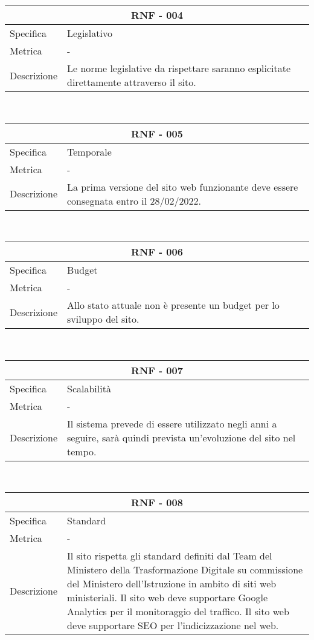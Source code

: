 \documentclass{article}
\begin{document}
\vspace{4mm} 
\begin{tabular}{ |p{3cm}|p{8cm}|  }
	\hline
	\multicolumn{2}{|c|}{\textbf{RNF - 004}} \\
	\hline
	Specifica&Legislativo\\
	\hline
	Metrica &  -\\
	\hline
	Descrizione&Le norme legislative da rispettare saranno esplicitate direttamente attraverso il sito.\\
	\hline
\end{tabular}\\
\vspace{4mm} 
\begin{tabular}{ |p{3cm}|p{8cm}|  }
	\hline
	\multicolumn{2}{|c|}{\textbf{RNF - 005}} \\
	\hline
	Specifica&Temporale \\
	\hline
	Metrica &  -\\
	\hline
	Descrizione&La prima versione del sito web funzionante deve essere consegnata entro il 28/02/2022.\\
	\hline
\end{tabular}\\
\vspace{4mm} 
\begin{tabular}{ |p{3cm}|p{8cm}|  }
	\hline
	\multicolumn{2}{|c|}{\textbf{RNF - 006}} \\
	\hline
	Specifica&Budget \\
	\hline
	Metrica &  -\\
	\hline
	Descrizione&Allo stato attuale non è presente un budget per lo sviluppo del sito.\\
	\hline
\end{tabular}\\
\vspace{4mm} 
\begin{tabular}{ |p{3cm}|p{8cm}|  }
	\hline
	\multicolumn{2}{|c|}{\textbf{RNF - 007}} \\
	\hline
	Specifica&Scalabilità \\
	\hline
	Metrica &  -\\
	\hline
	Descrizione&Il sistema prevede di essere utilizzato negli anni a seguire, sarà quindi prevista un'evoluzione del sito nel tempo.\\
	\hline
\end{tabular}\\
\vspace{4mm} 
\begin{tabular}{ |p{3cm}|p{8cm}|  }
	\hline
	\multicolumn{2}{|c|}{\textbf{RNF - 008}} \\
	\hline
	Specifica&Standard \\
	\hline
	Metrica &  -\\
	\hline
	Descrizione&Il sito rispetta gli standard definiti dal Team del Ministero della Trasformazione Digitale su commissione del Ministero dell'Istruzione in ambito di siti web ministeriali.
	Il sito web deve supportare Google Analytics per il monitoraggio del traffico. Il sito web deve supportare SEO per l'indicizzazione nel web.\\
	\hline
\end{tabular}\\
\end{document}
